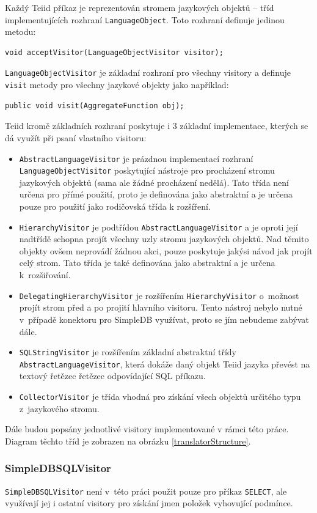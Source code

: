 \documentclass[oneside,12pt]{fithesis2}
\begin{document}
Každý Teiid příkaz je reprezentován stromem jazykových objektů -- tříd implementujících rozhraní \texttt{LanguageObject}. Toto rozhraní definuje jedinou metodu: 
\begin{Verbatim}[fontsize=\small]
void acceptVisitor(LanguageObjectVisitor visitor);
\end{Verbatim}
\texttt{LanguageObjectVisitor} je základní rozhraní pro všechny visitory a definuje \texttt{visit} metody pro všechny jazykové objekty jako například:
\begin{Verbatim}[fontsize=\small]
public void visit(AggregateFunction obj);
\end{Verbatim}
Teiid kromě základních rozhraní poskytuje i 3 základní implementace, kterých se dá využít při psaní vlastního visitoru:
\begin{itemize}
 \item \texttt{AbstractLanguageVisitor} je prázdnou implementací rozhraní \texttt{Language\allowbreak ObjectVisitor} poskytující nástroje pro procházení stromu jazykových objektů (sama ale žádné procházení nedělá). Tato třída není určena pro přímé použití, proto je definována jako abstraktní a je určena pouze pro použití jako rodičovská třída k rozšíření.
 \item \texttt{HierarchyVisitor} je podtřídou \texttt{AbstractLanguageVisitor} a je oproti její nadtřídě schopna projít všechny uzly stromu jazykových objektů. Nad těmito objekty ovšem neprovádí žádnou akci, pouze poskytuje jakýsi návod jak projít celý strom. Tato třída je také definována jako abstraktní a je určena k~rozšiřování.
 \item \texttt{DelegatingHierarchyVisitor} je rozšířením \texttt{HierarchyVisitor} o~možnost projít strom před a po projití hlavního visitoru. Tento nástroj nebylo nutné v~případě konektoru pro SimpleDB využívat, proto se jím nebudeme zabývat dále.
 \item \texttt{SQLStringVisitor} je rozšířením základní abstraktní třídy \texttt{Abstract\allowbreak LanguageVisitor}, která dokáže daný objekt Teiid jazyka převést na textový řetězec řetězec odpovídající SQL příkazu.
 \item \texttt{CollectorVisitor} je třída vhodná pro získání všech objektů určitého typu z~jazykového stromu.
\end{itemize}

Dále budou popsány jednotlivé visitory implementované v rámci této práce. Diagram těchto tříd je zobrazen na obrázku \ref{translatorStructure}.

\subsubsection*{SimpleDBSQLVisitor}
\texttt{SimpleDBSQLVisitor} není v~této práci použit pouze pro příkaz \texttt{SELECT}, ale využívají jej i ostatní visitory pro získání jmen položek vyhovující podmínce. 
\end{document}
